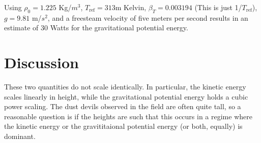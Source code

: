 \documentclass{article}
\begin{document}
Using $\rho_0 = 1.225$ Kg/$m^3$, $T_{\text{ref}}=313$m Kelvin, $\beta_T = 0.003194$
(This is just 1/$T_{\text{ref}}$), $g=9.81$ m/$s^2$, and a freesteam
velocity of five meters per second results in an
estimate of 30 Watts for the gravitational potential energy. 

\section*{Discussion}

These two quantities do not scale identically. In particular, 
the kinetic energy scales linearly in height, while the gravitational potential 
energy holds a cubic power scaling. The dust devils observed in the field are often quite tall,
so a reasonable question is if the heights are such that this occurs in a regime where the kinetic
energy or the gravititaional potential energy (or both, equally) is dominant. 

%
%

\end{document}
